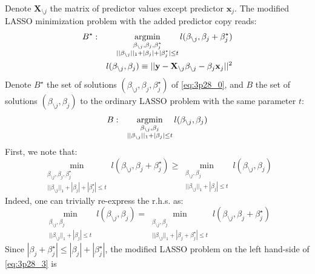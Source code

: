 

Denote $\mathbf{X}_{\setminus j}$ the matrix of predictor values except predictor
$\mathbf{x}_j$. The modified LASSO minimization problem with the added predictor copy
reads:
\begin{eqnarray} \label{eq:3p28_0}
B^\star: &&\operatorname*{argmin}_{\substack{\beta_{\setminus j}, \beta_j, \beta_j^\star \\
        ||\beta_{\setminus j}||_1 + |\beta_j| + |\beta_j^\star| \leq t}}
    l(\beta_{\setminus j}, \beta_j + \beta_j^\star) \\
&& l(\beta_{\setminus j}, \beta_j)  \equiv || \mathbf{y} - \mathbf{X}_{\setminus j} \beta_{\setminus j} - \beta_j \mathbf{x}_j||^2 
\end{eqnarray}
Denote $B^\star$ the set of solutions $(\beta_{\setminus j}, \beta_j, \beta_j^\star)$ of \eqref{eq:3p28_0}, and
$B$ the set of solutions $(\beta_{\setminus j}, \beta_j)$ to the ordinary LASSO problem with the
same parameter $t$:
\begin{eqnarray} \label{eq:3p28_1}
B: &&\operatorname*{argmin}_{\substack{\beta_{\setminus j}, \beta_j \\
        ||\beta_{\setminus j}||_1 + |\beta_j| \leq t}}
l(\beta_{\setminus j}, \beta_j)
\end{eqnarray}
First, we note that:
\begin{equation}\label{eq:3p28_3}
\min_{\substack{\beta_{\setminus j}, \beta_j, \beta_j^\star \\
        ||\beta_{\setminus j}||_1 + |\beta_j| + |\beta_j^\star| \leq t}}
l(\beta_{\setminus j}, \beta_j + \beta_j^\star) \geq \min_{\substack{\beta_{\setminus j}, \beta_j \\
        ||\beta_{\setminus j}||_1 + |\beta_j| \leq t}}
l(\beta_{\setminus j}, \beta_j)
\end{equation}
Indeed, one can trivially re-express the r.h.s. as:
\begin{equation} \label{eq:3p28_2}
\min_{\substack{\beta_{\setminus j}, \beta_j \\
        ||\beta_{\setminus j}||_1 + |\beta_j| \leq t}}
l(\beta_{\setminus j}, \beta_j) = 
\min_{\substack{\beta_{\setminus j}, \beta_j \\
        ||\beta_{\setminus j}||_1 + |\beta_j + \beta_j^\star| \leq t}}
l(\beta_{\setminus j}, \beta_j + \beta_j^\star) 
\end{equation}
Since $|\beta_j + \beta_j^\star| \leq |\beta_j| + |\beta_j^\star|$,
the modified LASSO problem on the left hand-side of \eqref{eq:3p28_3} is
